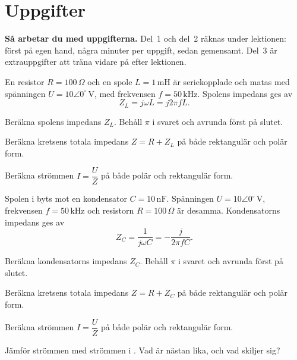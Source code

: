 
\section{Uppgifter}
\label{c16:sec:uppgifter}

\begin{aside}
\textbf{Så arbetar du med uppgifterna.} Del~1 och del~2 räknas under lektionen: först på egen
hand, några minuter per uppgift, sedan gemensamt. Del~3 är extrauppgifter att träna vidare på
efter lektionen.

\end{aside}


En resistor $R = 100\,\Omega$ och en spole $L = 1\,\text{mH}$ är seriekopplade och matas med
spänningen $U = 10\angle 0^{\circ}\,\text{V}$, med frekvensen $f = 50\,\text{kHz}$. Spolens
impedans ges av
\[
  Z_L = j\omega L = j2\pi f L.
\]
\begin{parts}
  \item Beräkna spolens impedans $Z_L$. Behåll $\pi$ i svaret och avrunda först på slutet.
  \item Beräkna kretsens totala impedans $Z = R + Z_L$ på både rektangulär och polär form.
  \item Beräkna strömmen $I = \dfrac{U}{Z}$ på både polär och rektangulär form.
\end{parts}

Spolen i  byts mot en kondensator $C = 10\,\text{nF}$. Spänningen
$U = 10\angle 0^{\circ}\,\text{V}$, frekvensen $f = 50\,\text{kHz}$ och resistorn
$R = 100\,\Omega$ är desamma. Kondensatorns impedans ges av
\[
  Z_C = \frac{1}{j\omega C} = -\frac{j}{2\pi f C}.
\]
\begin{parts}
  \item Beräkna kondensatorns impedans $Z_C$. Behåll $\pi$ i svaret och avrunda först på
    slutet.
  \item Beräkna kretsens totala impedans $Z = R + Z_C$ på både rektangulär och polär form.
  \item Beräkna strömmen $I = \dfrac{U}{Z}$ på både polär och rektangulär form.
  \item Jämför strömmen med strömmen i . Vad är nästan lika, och vad skiljer
    sig?
\end{parts}


